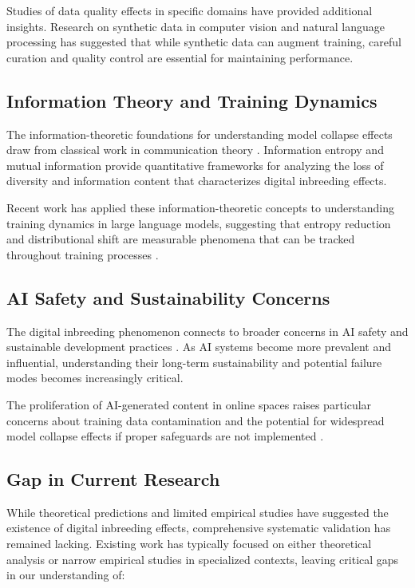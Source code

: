 \documentclass[11pt]{article}
\begin{document}
Studies of data quality effects in specific domains have provided additional insights. Research on synthetic data in computer vision \citep{borji2022pros} and natural language processing has suggested that while synthetic data can augment training, careful curation and quality control are essential for maintaining performance.

\subsection{Information Theory and Training Dynamics}

The information-theoretic foundations for understanding model collapse effects draw from classical work in communication theory \citep{shannon1948mathematical, cover1999elements}. Information entropy and mutual information provide quantitative frameworks for analyzing the loss of diversity and information content that characterizes digital inbreeding effects.

Recent work has applied these information-theoretic concepts to understanding training dynamics in large language models, suggesting that entropy reduction and distributional shift are measurable phenomena that can be tracked throughout training processes \citep{hoffmann2022training}.

\subsection{AI Safety and Sustainability Concerns}

The digital inbreeding phenomenon connects to broader concerns in AI safety and sustainable development practices \citep{amodei2016concrete, russell2019human}. As AI systems become more prevalent and influential, understanding their long-term sustainability and potential failure modes becomes increasingly critical.

The proliferation of AI-generated content in online spaces raises particular concerns about training data contamination and the potential for widespread model collapse effects if proper safeguards are not implemented \citep{solaiman2019release}.

\subsection{Gap in Current Research}

While theoretical predictions and limited empirical studies have suggested the existence of digital inbreeding effects, comprehensive systematic validation has remained lacking. Existing work has typically focused on either theoretical analysis or narrow empirical studies in specialized contexts, leaving critical gaps in our understanding of:
\end{document}
